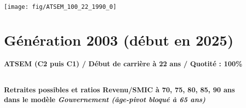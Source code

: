 \vspace{0.1cm} 

 {\hspace{-2.2cm}\texttt{[image: fig/ATSEM\_100\_22\_1990\_0]}} 

\newpage 
 
\section{Génération 2003 (début en 2025)\label{ATSEM_100_22_2003_0}} 
 
{\bf \noindent ATSEM (C2 puis C1) / Début de carrière à 22 ans / Quotité : 100\%}  ~ 

 ~\\{\bf \noindent Retraites possibles et ratios Revenu/SMIC à 70, 75, 80, 85, 90 ans dans le modèle \emph{Gouvernement (âge-pivot bloqué à 65 ans)}}  
 

